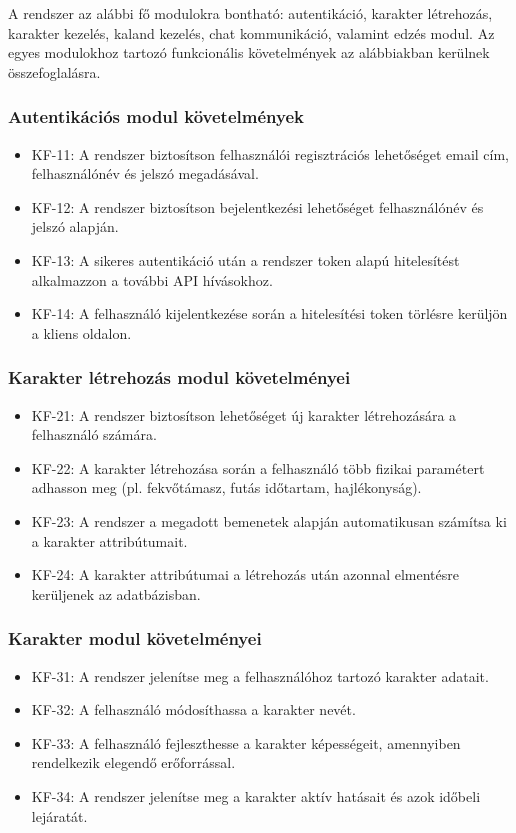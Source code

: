 \documentclass[
]{thesis-ekf}
\theoremstyle{definition}
\theoremstyle{remark}
\begin{document}
A rendszer az alábbi fő modulokra bontható: autentikáció, karakter létrehozás, karakter kezelés, kaland kezelés, chat kommunikáció, valamint edzés modul. Az egyes modulokhoz tartozó funkcionális követelmények az alábbiakban kerülnek összefoglalásra.

\subsubsection{Autentikációs modul követelmények}


\begin{itemize}
    \item KF-11: A rendszer biztosítson felhasználói regisztrációs lehetőséget email cím, felhasználónév és jelszó megadásával.
    \item KF-12: A rendszer biztosítson bejelentkezési lehetőséget felhasználónév és jelszó alapján.
    \item KF-13: A sikeres autentikáció után a rendszer token alapú hitelesítést alkalmazzon a további API hívásokhoz.
    \item KF-14: A felhasználó kijelentkezése során a hitelesítési token törlésre kerüljön a kliens oldalon.
\end{itemize}

\subsubsection{Karakter létrehozás modul követelményei}

\begin{itemize}
    \item KF-21: A rendszer biztosítson lehetőséget új karakter létrehozására a felhasználó számára.
    \item KF-22: A karakter létrehozása során a felhasználó több fizikai paramétert adhasson meg (pl. fekvőtámasz, futás időtartam, hajlékonyság).
    \item KF-23: A rendszer a megadott bemenetek alapján automatikusan számítsa ki a karakter attribútumait.
    \item KF-24: A karakter attribútumai a létrehozás után azonnal elmentésre kerüljenek az adatbázisban.
\end{itemize}

\subsubsection{Karakter modul követelményei}

\begin{itemize}
    \item KF-31: A rendszer jelenítse meg a felhasználóhoz tartozó karakter adatait.
    \item KF-32: A felhasználó módosíthassa a karakter nevét.
    \item KF-33: A felhasználó fejleszthesse a karakter képességeit, amennyiben rendelkezik elegendő erőforrással.
    \item KF-34: A rendszer jelenítse meg a karakter aktív hatásait és azok időbeli lejáratát.
\end{itemize}
\end{document}
